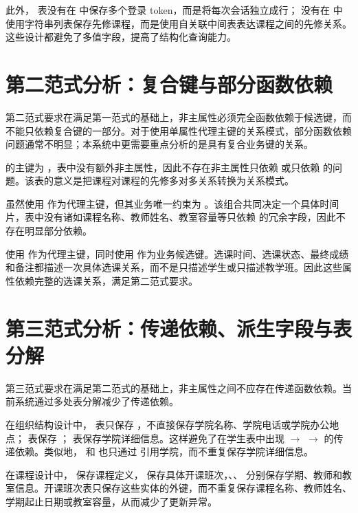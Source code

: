 此外， 表没有在  中保存多个登录 token，而是将每次会话独立成行； 没有在  中使用字符串列表保存先修课程，而是使用自关联中间表表达课程之间的先修关系。这些设计都避免了多值字段，提高了结构化查询能力。

\section{第二范式分析：复合键与部分函数依赖}

第二范式要求在满足第一范式的基础上，非主属性必须完全函数依赖于候选键，而不能只依赖复合键的一部分。对于使用单属性代理主键的关系模式，部分函数依赖问题通常不明显；本系统中更需要重点分析的是具有复合业务键的关系。

 的主键为 ，表中没有额外非主属性，因此不存在非主属性只依赖  或只依赖  的问题。该表的意义是把课程对课程的先修多对多关系转换为关系模式。

 虽然使用  作为代理主键，但其业务唯一约束为 。该组合共同决定一个具体时间片，表中没有诸如课程名称、教师姓名、教室容量等只依赖  的冗余字段，因此不存在明显部分依赖。

 使用  作为代理主键，同时使用  作为业务候选键。选课时间、选课状态、最终成绩和备注都描述一次具体选课关系，而不是只描述学生或只描述教学班。因此这些属性依赖完整的选课关系，满足第二范式要求。

\section{第三范式分析：传递依赖、派生字段与表分解}

第三范式要求在满足第二范式的基础上，非主属性之间不应存在传递函数依赖。当前系统通过多处表分解减少了传递依赖。

在组织结构设计中， 表只保存 ，不直接保存学院名称、学院电话或学院办公地点； 表保存 ； 表保存学院详细信息。这样避免了在学生表中出现  $\rightarrow$  $\rightarrow$  的传递依赖。类似地， 和  也只通过  引用学院，而不重复保存学院详细信息。

在课程设计中， 保存课程定义， 保存具体开课班次，、、 分别保存学期、教师和教室信息。开课班次表只保存这些实体的外键，而不重复保存课程名称、教师姓名、学期起止日期或教室容量，从而减少了更新异常。

